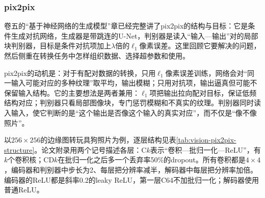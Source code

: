 \subsubsection{pix2pix}
\label{sec:vision-generation-pix2pix}

卷五的“基于神经网络的生成模型”章已经完整讲了pix2pix的结构与目标：它是条件生成对抗网络，生成器是带跳连的U-Net，判别器是读入“输入—输出”对的局部块判别器，目标是条件对抗项加上$\lambda$倍的$\ell_1$像素误差。这里回顾它要解决的问题，然后侧重在转换任务中怎样组织数据、选择超参数和使用。

pix2pix的动机是：对于有配对数据的转换，只用$\ell_1$像素误差训练，网络会对“同一输入可能对应的多种纹理”取平均，输出模糊；只用对抗项，输出逼真但可能不保留输入结构。它的主要想法是两者兼用：$\ell_1$项把输出拉向配对目标，保证低频结构对应；判别器只看局部图像块，专门惩罚模糊和不真实的纹理。判别器同时读入输入，使它判断的是“这个输出是否像这个输入的真实对应”，而不仅是“像不像照片”。

以$256\times256$的边缘图转玩具狗照片为例，逐层结构见表\ref{tab:vision-pix2pix-structure}。论文附录用两个记号描述各层：C$k$表示“卷积—批归一化—ReLU”，有$k$个卷积核；CD$k$在批归一化之后多一个丢弃率50\%的dropout。所有卷积都是$4\times4$，编码器和判别器中步长为2、每层把分辨率减半，解码器中每层把分辨率加倍。编码器的ReLU都是斜率0.2的leaky ReLU，第一层C64不加批归一化；解码器使用普通ReLU。

